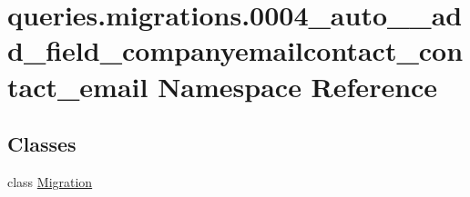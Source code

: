\hypertarget{namespacequeries_1_1migrations_1_10004__auto____add__field__companyemailcontact__contact__email}{\section{queries.\-migrations.0004\-\_\-auto\-\_\-\-\_\-add\-\_\-field\-\_\-companyemailcontact\-\_\-contact\-\_\-email Namespace Reference}
\label{namespacequeries_1_1migrations_1_10004__auto____add__field__companyemailcontact__contact__email}
}
\subsection*{Classes}
\begin{DoxyCompactItemize}
\item 
class \hyperlink{classqueries_1_1migrations_1_10004__auto____add__field__companyemailcontact__contact__email_1_1_migration}{Migration}
\end{DoxyCompactItemize}
